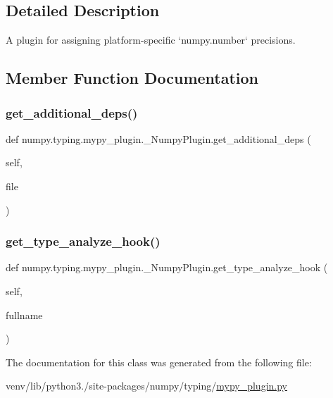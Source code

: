 \subsection{Detailed Description}
\begin{DoxyVerb}A plugin for assigning platform-specific `numpy.number` precisions.\end{DoxyVerb}
 

\subsection{Member Function Documentation}
\mbox{\label{classnumpy_1_1typing_1_1mypy__plugin_1_1__NumpyPlugin_a13dacd26fb15f95d074eb617a1642631}} 
\subsubsection{\texorpdfstring{get\+\_\+additional\+\_\+deps()}{get\_additional\_deps()}}
{\footnotesize\ttfamily def numpy.\+typing.\+mypy\+\_\+plugin.\+\_\+\+Numpy\+Plugin.\+get\+\_\+additional\+\_\+deps (\begin{DoxyParamCaption}\item[{}]{self,  }\item[{}]{file }\end{DoxyParamCaption})}

\mbox{\label{classnumpy_1_1typing_1_1mypy__plugin_1_1__NumpyPlugin_a9fe03522416589184c8e6c5df4494964}} 
\subsubsection{\texorpdfstring{get\+\_\+type\+\_\+analyze\+\_\+hook()}{get\_type\_analyze\_hook()}}
{\footnotesize\ttfamily def numpy.\+typing.\+mypy\+\_\+plugin.\+\_\+\+Numpy\+Plugin.\+get\+\_\+type\+\_\+analyze\+\_\+hook (\begin{DoxyParamCaption}\item[{}]{self,  }\item[{}]{fullname }\end{DoxyParamCaption})}



The documentation for this class was generated from the following file\+:\begin{DoxyCompactItemize}
\item 
venv/lib/python3./site-\/packages/numpy/typing/\hyperlink{mypy__plugin_8py}{mypy\+\_\+plugin.\+py}\end{DoxyCompactItemize}

